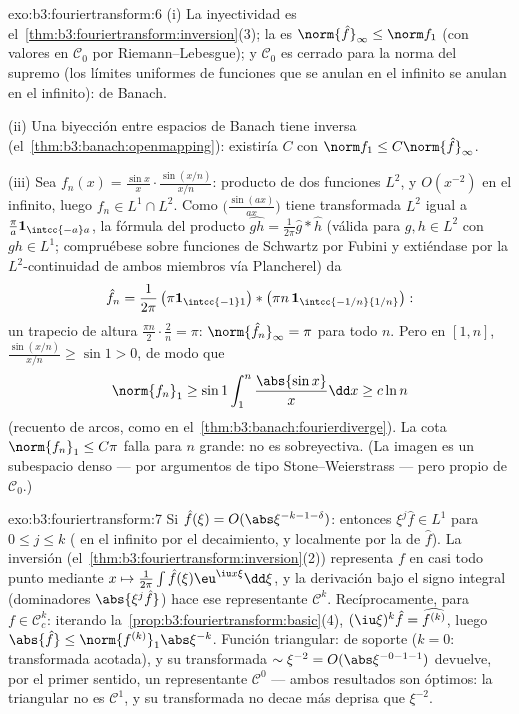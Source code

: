 \begin{solution}{exo:b3:fouriertransform:6}
(i) La inyectividad es el~\cref{thm:b3:fouriertransform:inversion}(3);
la  es
$\norm{\hat f}_\infty \leq \norm f_1$ (con valores en $\mathcal C_0$ por
Riemann--Lebesgue); y $\mathcal C_0$ es cerrado para la norma del
supremo (los límites uniformes de funciones que se anulan en el infinito
se anulan en el infinito): de Banach.

(ii) Una biyección  entre
espacios de Banach tiene inversa
(el~\cref{thm:b3:banach:openmapping}): existiría $C$ con
$\norm f_1 \leq C\norm{\hat f}_\infty$.

(iii) Sea $f_n(x) = \frac{\sin x}x\cdot\frac{\sin(x/n)}{x/n}$: producto
de dos funciones $L^2$, y $O(x^{-2})$ en el infinito, luego
$f_n \in L^1\cap L^2$. Como $\bigl(\frac{\sin(ax)}{ax}\bigr)$ tiene
transformada $L^2$ igual a $\frac\pi a\mathbf 1_{\intcc{-a}a}$, la
fórmula del producto $\widehat{gh} = \frac1{2\pi}\hat g * \hat h$
(válida para $g, h
\in L^2$ con $gh \in L^1$; compruébese sobre funciones de Schwartz por
Fubini y extiéndase por la $L^2$-continuidad de ambos miembros vía
Plancherel) da
\[
\hat f_n = \frac1{2\pi}\,\bigl(\pi\mathbf
1_{\intcc{-1}1}\bigr) * \bigl(\pi n\,\mathbf
1_{\intcc{-1/n}{1/n}}\bigr):
\]
un trapecio de altura $\frac{\pi n}2\cdot\frac2n = \pi$:
$\norm{\hat f_n}_\infty = \pi$ para todo $n$. Pero en $[1,
n]$, $\frac{\sin(x/n)}{x/n} \geq \sin 1 > 0$, de modo que
\[
\norm{f_n}_1 \geq \sin 1\int_1^n\frac{\abs{\sin x}}x\dd x
\geq c\ln n
\]
(recuento de arcos, como en el~\cref{thm:b3:banach:fourierdiverge}). La
cota $\norm{f_n}_1 \leq C\pi$ falla para $n$ grande: no es sobreyectiva.
(La imagen es un subespacio denso --- por argumentos de tipo
Stone--Weierstrass --- pero propio de
$\mathcal C_0$.)
\end{solution}

\begin{solution}{exo:b3:fouriertransform:7}
Si $\hat f(\xi) = O(\abs\xi^{-k-1-\delta})$: entonces $\xi^j\hat f
\in L^1$ para $0 \leq j \leq k$ (
en el infinito por el decaimiento, y localmente por la
 de $\hat f$). La
inversión (el~\cref{thm:b3:fouriertransform:inversion}(2)) representa
$f$ en casi todo punto mediante
$x \mapsto \frac1{2\pi}\int\hat f(\xi)\eu^{\iu
x\xi}\dd\xi$, y la derivación bajo el signo integral (dominadores
$\abs{\xi^j\hat f}$) hace ese representante $\mathcal C^k$.
Recíprocamente, para $f \in \mathcal C_c^k$: iterando
la~\cref{prop:b3:fouriertransform:basic}(4),
$(\iu\xi)^k\hat f = \widehat{f^{(k)}}$, luego $\abs{\hat f} \leq
\norm{f^{(k)}}_1\abs\xi^{-k}$. Función triangular:
 de soporte
 ($k = 0$: transformada
acotada), y su transformada $\sim \xi^{-2} = O(\abs\xi^{-0-1-1})$
devuelve, por el primer sentido, un representante $\mathcal C^0$ ---
ambos resultados son óptimos: la triangular no es $\mathcal C^1$, y su
transformada no decae más deprisa que $\xi^{-2}$.
\end{solution}


